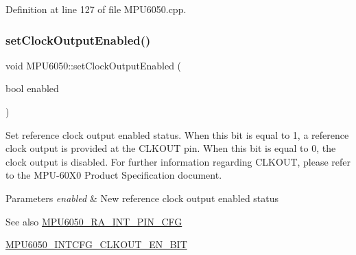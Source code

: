 Definition at line 127 of file M\+P\+U6050.\+cpp.


\begin{DoxyCode}{0}

\end{DoxyCode}
\mbox{\label{classMPU6050_a71ec4642b6f6c937bbf6a24fea4179e5}} 
\subsubsection{\texorpdfstring{setClockOutputEnabled()}{setClockOutputEnabled()}}
{\footnotesize\ttfamily void M\+P\+U6050\+::set\+Clock\+Output\+Enabled (\begin{DoxyParamCaption}\item[{bool}]{enabled }\end{DoxyParamCaption})}

Set reference clock output enabled status. When this bit is equal to 1, a reference clock output is provided at the C\+L\+K\+O\+UT pin. When this bit is equal to 0, the clock output is disabled. For further information regarding C\+L\+K\+O\+UT, please refer to the M\+P\+U-\/60\+X0 Product Specification document. 
\begin{DoxyParams}{Parameters}
{\em enabled} & New reference clock output enabled status \\
\hline
\end{DoxyParams}
\begin{DoxySeeAlso}{See also}
\mbox{\hyperlink{MPU6050_8h_a82344e1daef2bac2e0d938319528be6c}{M\+P\+U6050\+\_\+\+R\+A\+\_\+\+I\+N\+T\+\_\+\+P\+I\+N\+\_\+\+C\+FG}} 

\mbox{\hyperlink{MPU6050_8h_af6f983ee1d32777d725f259c7806f15a}{M\+P\+U6050\+\_\+\+I\+N\+T\+C\+F\+G\+\_\+\+C\+L\+K\+O\+U\+T\+\_\+\+E\+N\+\_\+\+B\+IT}} 
\end{DoxySeeAlso}


